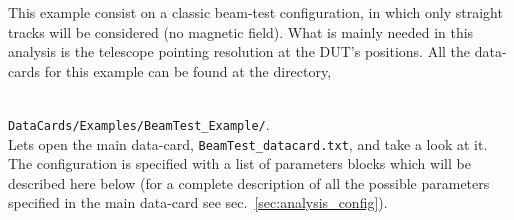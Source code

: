 This example consist on a classic beam-test configuration, in which only straight tracks will be considered (no magnetic field). 
What is mainly needed in this analysis is the telescope pointing resolution at the DUT's positions. All the data-cards for this 
example can be found at the directory, 

~\\
{\tt DataCards/Examples/BeamTest\_Example/}.
~\\

\noindent
Lets open the main data-card, {\tt BeamTest\_datacard.txt}, and take a look at it. The configuration is specified with a list of 
parameters blocks which will be described here below (for a complete description of all the possible parameters specified in the 
main data-card see sec.~\ref{sec:analysis_config}).

